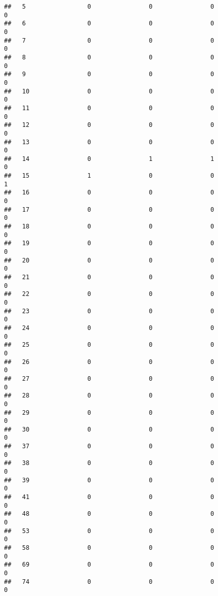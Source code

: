 \documentclass[]{article}
\begin{document}
\begin{verbatim}
##   5                 0                0                0                0
##   6                 0                0                0                0
##   7                 0                0                0                0
##   8                 0                0                0                0
##   9                 0                0                0                0
##   10                0                0                0                0
##   11                0                0                0                0
##   12                0                0                0                0
##   13                0                0                0                0
##   14                0                1                1                0
##   15                1                0                0                1
##   16                0                0                0                0
##   17                0                0                0                0
##   18                0                0                0                0
##   19                0                0                0                0
##   20                0                0                0                0
##   21                0                0                0                0
##   22                0                0                0                0
##   23                0                0                0                0
##   24                0                0                0                0
##   25                0                0                0                0
##   26                0                0                0                0
##   27                0                0                0                0
##   28                0                0                0                0
##   29                0                0                0                0
##   30                0                0                0                0
##   37                0                0                0                0
##   38                0                0                0                0
##   39                0                0                0                0
##   41                0                0                0                0
##   48                0                0                0                0
##   53                0                0                0                0
##   58                0                0                0                0
##   69                0                0                0                0
##   74                0                0                0                0

\end{verbatim}
\end{document}
